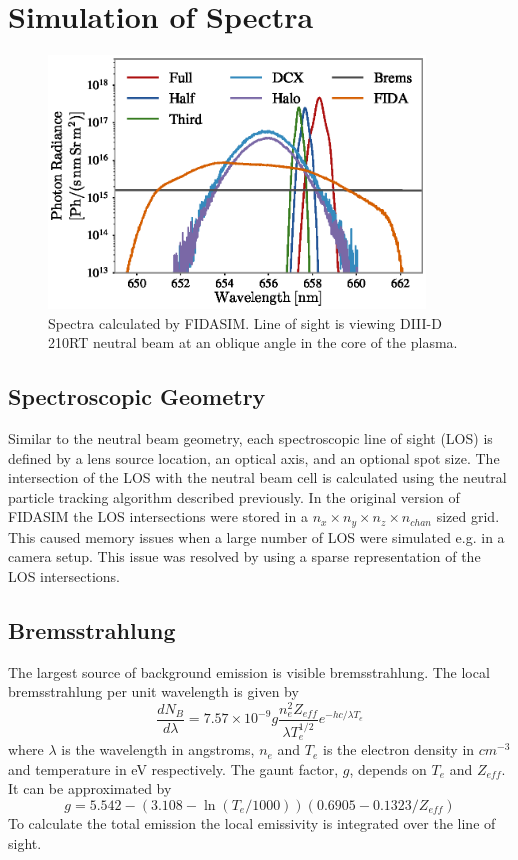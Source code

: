 \section{Simulation of Spectra}
\begin{figure}[h!]
    \centering
    \includegraphics[width=10cm]{figures/spectra.eps}
    \caption{Spectra calculated by FIDASIM. Line of sight is viewing DIII-D 210RT neutral beam at an oblique angle in the core of the plasma.}
    \label{fig:spectra}
\end{figure}
\subsection{Spectroscopic Geometry}
Similar to the neutral beam geometry, each spectroscopic line of sight (LOS) is defined by a lens source location, an optical axis, and an optional spot size. The intersection of the LOS with the neutral beam cell is calculated using the neutral particle tracking algorithm described previously. In the original version of FIDASIM the LOS intersections were stored in a $n_x \times n_y \times n_z \times n_{chan}$ sized grid. This caused memory issues when a large number of LOS were simulated e.g. in a camera setup. This issue was resolved by using a sparse representation of the LOS intersections.

\subsection{Bremsstrahlung}
The largest source of background emission is visible bremsstrahlung. The local bremsstrahlung per unit wavelength is given by
\begin{equation}\label{eq:brems}
    \frac{dN_B}{d\lambda} = 7.57\times10^{-9} g\frac{n_e^2 Z_{eff}}{\lambda T_e^{1/2}}e^{-hc/\lambda T_e}
\end{equation}
where $\lambda$ is the wavelength in angstroms, $n_e$ and $T_e$ is the electron density in $cm^{-3}$ and temperature in eV respectively. The gaunt factor, $g$, depends on $T_e$ and $Z_{eff}$. It can be approximated by
\begin{equation}\label{eq:gaunt}
    g = 5.542 - (3.108 - \ln(T_e/1000))(0.6905 - 0.1323/Z_{eff})
\end{equation}
To calculate the total emission the local emissivity is integrated over the line of sight.\cite{van2010imaging}

